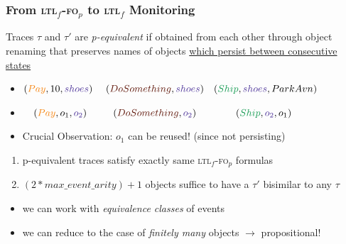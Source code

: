\documentclass[xcolor=dvipsnames]{beamer}
\newcommand{\ltlf}{\textsc{ltl}$_f$\xspace}
\newcommand{\ltlffop}{\ltlf-\textsc{fo}$_p$\xspace}
\newcommand{\green}[1]{\textcolor{ForestGreen}{#1}}
\newcommand{\orange}[1]{\textcolor{BurntOrange}{#1}}
\newcommand{\violet}[1]{\textcolor{Violet}{#1}}
\newcommand{\sepia}[1]{\textcolor{Sepia}{#1}}
\begin{document}
\begin{frame}
\frametitle{From \ltlffop to \ltlf Monitoring}

\begin{definition}[p-equivalence]
Traces $\tau$ and $\tau'$ are \emph{p-equivalent} if obtained from each other through object renaming 
that preserves names of objects \ul{which persist between consecutive states}
\end{definition}

\begin{itemize}
	\item $(\orange{Pay},10,\violet{shoes})~~~~(\sepia{DoSomething},\violet{shoes})~~~(\green{Ship},\violet{shoes},Park Avn)$
	\item $~~~(\orange{Pay},o_1,\violet{o_2})~~~~~~~~(\sepia{DoSomething},\violet{o_2})~~~~~~~~~~~~(\green{Ship},\violet{o_2},o_1)$
	\item Crucial Observation: $o_1$ can be reused! (since not persisting)
\end{itemize}


\begin{theorem}
	\begin{enumerate}
		\item p-equivalent traces satisfy exactly same \ltlffop formulas
		\item $(2*max\_event\_arity)+1$ objects suffice to have a $\tau'$
			bisimilar to any $\tau$
	\end{enumerate}
\end{theorem}


\begin{itemize}
	\item we can work with \emph{equivalence classes} of events
	\item we can reduce to the case of \emph{finitely many} objects $\rightarrow$ propositional!
\end{itemize}
\end{frame}

\end{document}
